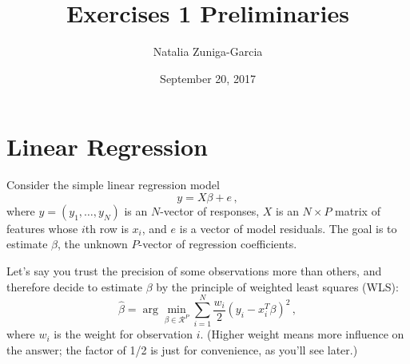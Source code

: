 \documentclass[11 pt]{article}
\author{Natalia Zuniga-Garcia}
\title{Exercises 1 Preliminaries}
\date{September 20, 2017}
\begin{document}
\maketitle

\section{Linear Regression}\label{sec:linr}
Consider the simple linear regression model
$$
y = X \beta + e \, ,
$$
where $y = (y_1, \ldots, y_N)$ is an $N$-vector of responses, $X$ is an $N \times P$ matrix of features whose $i$th row is $x_i$, and $e$ is a vector of model residuals.  The goal is to estimate $\beta$, the unknown $P$-vector of regression coefficients.  

Let's say you trust the precision of some observations more than others, and therefore decide to estimate $\beta$ by the principle of weighted least squares (WLS):
$$
\hat{\beta} = \arg \min_{\beta \in \mathcal{R}^P} \sum_{i=1}^N \frac{w_i}{2}(y_i - x_i^T \beta)^2 \, ,
$$
where $w_i$ is the weight for observation $i$.  (Higher weight means more influence on the answer; the factor of 1/2 is just for convenience, as you'll see later.)
\end{document}
